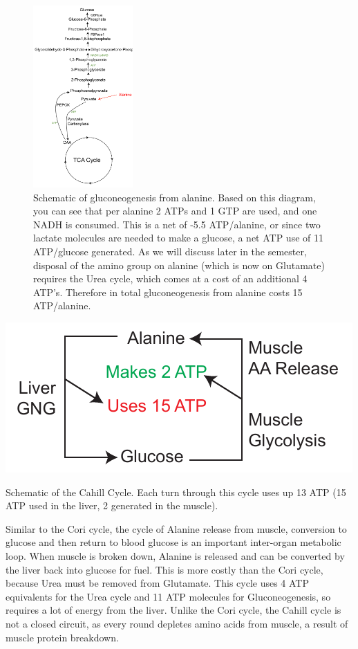 \documentclass{tufte-handout}
\begin{document}
\begin{figure}
\begin{center}
\includegraphics[width=1.5in]{figures/gluconeogenic-substrates-alanine.pdf}
\caption{Schematic of gluconeogenesis from alanine.  Based on this diagram, you can see that per alanine 2 ATPs and 1 GTP are used, and one NADH is consumed.  This is a net of -5.5 ATP/alanine, or since two lactate molecules are needed to make a glucose, a net ATP use of 11 ATP/glucose generated.  As we will discuss later in the semester, disposal of the amino group on alanine (which is now on Glutamate) requires the Urea cycle, which comes at a cost of an additional 4 ATP's.  Therefore in total gluconeogenesis from alanine costs 15 ATP/alanine.}
\label{fig:gluconeogenic-substrates-alanine}
\end{center}
\end{figure}

\begin{marginfigure}
\includegraphics{figures/cahill-cycle.pdf}
\caption{Schematic of the Cahill Cycle.  Each turn through this cycle uses up 13 ATP (15 ATP used in the liver, 2 generated in the muscle).}
\label{fig:cahill-cycle}
\end{marginfigure}

  Similar to the Cori cycle, the cycle of Alanine release from muscle, conversion to glucose and then return to blood glucose is an important inter-organ metabolic loop.  When muscle is broken down, Alanine is released and can be converted by the liver back into glucose for fuel.  This is more costly than the Cori cycle, because Urea must be removed from Glutamate.  This cycle uses 4 ATP equivalents for the Urea cycle and 11 ATP molecules for Gluconeogenesis, so requires a lot of energy from the liver.  Unlike the Cori cycle, the Cahill cycle is not a closed circuit, as every round depletes amino acids from muscle, a result of muscle protein breakdown.
\end{document}
